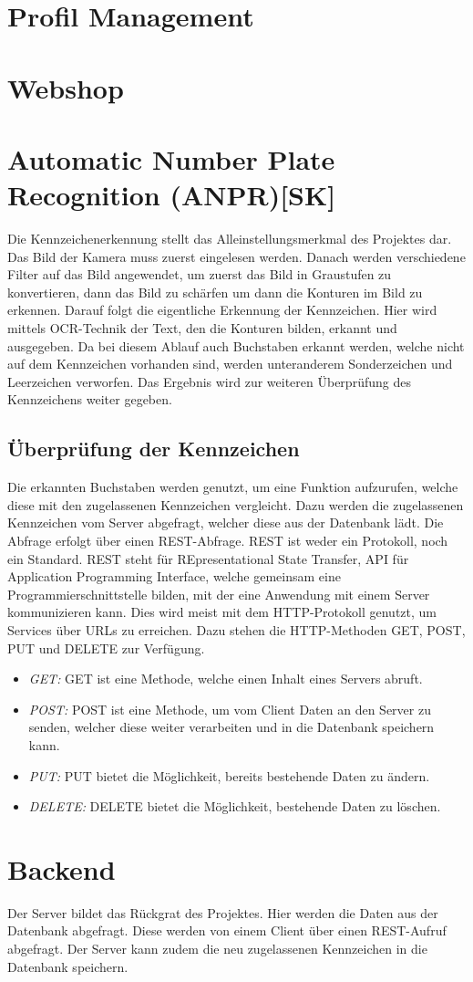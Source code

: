 \section{Profil Management}
\section{Webshop}
\section{Automatic Number Plate Recognition (ANPR)[SK]}
Die Kennzeichenerkennung stellt das Alleinstellungsmerkmal des Projektes dar. Das Bild der Kamera muss zuerst eingelesen werden. Danach werden verschiedene Filter auf das Bild angewendet, um zuerst das Bild in Graustufen zu konvertieren, dann das Bild zu schärfen um dann die Konturen im Bild zu erkennen. Darauf folgt die eigentliche Erkennung der Kennzeichen. Hier wird mittels OCR-Technik der Text, den die Konturen bilden, erkannt und ausgegeben. Da bei diesem Ablauf auch Buchstaben erkannt werden, welche nicht auf dem Kennzeichen vorhanden sind, werden unteranderem Sonderzeichen und Leerzeichen verworfen. Das Ergebnis wird zur weiteren Überprüfung des Kennzeichens weiter gegeben.

\subsection{Überprüfung der Kennzeichen}
Die erkannten Buchstaben werden genutzt, um eine Funktion aufzurufen, welche diese mit den zugelassenen Kennzeichen vergleicht. Dazu werden die zugelassenen Kennzeichen vom Server abgefragt, welcher diese aus der Datenbank lädt. Die Abfrage erfolgt über einen REST-Abfrage.
REST ist weder ein Protokoll, noch ein Standard. REST steht für REpresentational State Transfer, API für Application Programming Interface, welche gemeinsam eine Programmierschnittstelle bilden, mit der eine Anwendung mit einem Server kommunizieren kann. Dies wird meist mit dem HTTP-Protokoll genutzt, um Services über URLs zu erreichen. Dazu stehen die HTTP-Methoden GET, POST, PUT und DELETE zur Verfügung.
\begin{itemize}
    \item \textit{GET: } GET ist eine Methode, welche einen Inhalt eines Servers abruft.
    \item \textit{POST: } POST ist eine Methode, um vom Client Daten an den Server zu senden, welcher diese weiter verarbeiten und in die Datenbank speichern kann.
    \item \textit{PUT: } PUT bietet die Möglichkeit, bereits bestehende Daten zu ändern.
    \item \textit{DELETE: } DELETE bietet die Möglichkeit, bestehende Daten zu löschen.
\end{itemize}\cite{WhatIsREST}
\section{Backend}
Der Server bildet das Rückgrat des Projektes. Hier werden die Daten aus der Datenbank abgefragt. Diese werden von einem Client über einen REST-Aufruf abgefragt. Der Server kann zudem die neu zugelassenen Kennzeichen in die Datenbank speichern.